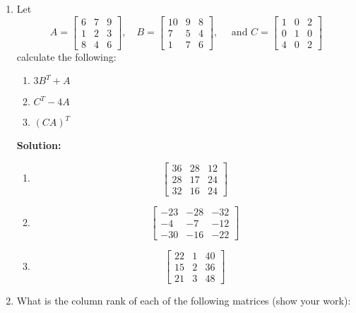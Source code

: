 \documentclass[letter,12pt]{article}
\begin{document}
\begin{enumerate}
    \item Let $$
        A = \begin{bmatrix} 6 & 7 & 9 \\ 1 & 2 & 3 \\ 8 & 4 & 6 \end{bmatrix}, \quad B = \begin{bmatrix} 10 & 9 & 8 \\ 7 & 5 & 4 \\ 1 & 7 & 6 \end{bmatrix}, \quad \text{ and } C = \begin{bmatrix} 1 & 0 & 2 \\ 0 & 1 & 0 \\ 4 & 0 & 2 \end{bmatrix}
    $$ calculate the following:
    
    \begin{enumerate}
        \item $3B^T + A$
        \item $C^T - 4A$
        \item $(CA)^T$
    \end{enumerate}
    
    {\bf Solution: }
    \begin{enumerate}
        \item $$
            \begin{bmatrix}
                36 & 28 & 12 \\ 
                28 & 17 & 24 \\ 
                32 & 16 & 24 
            \end{bmatrix}
        $$
        \item $$
            \begin{bmatrix}
                -23 & -28 & -32 \\ 
                -4 & -7 & -12 \\ 
                -30 & -16 & -22
            \end{bmatrix}
        $$
        \item $$
            \begin{bmatrix}
                22 & 1 & 40\\
                15 & 2 & 36\\
                21 & 3 & 48
            \end{bmatrix}
        $$
    \end{enumerate}
    
    \item What is the column rank of each of the following matrices (show your work):
    

\end{enumerate}
\end{document}
